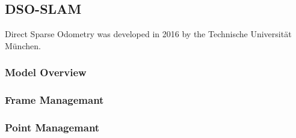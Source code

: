 	\subsection{DSO-SLAM}
	
	Direct Sparse Odometry was developed in 2016 by the Technische Universität München. %
	
	\subsubsection{Model Overview}
	
	\subsubsection{Frame Managemant}
	
	\subsubsection{Point Managemant}
 
 